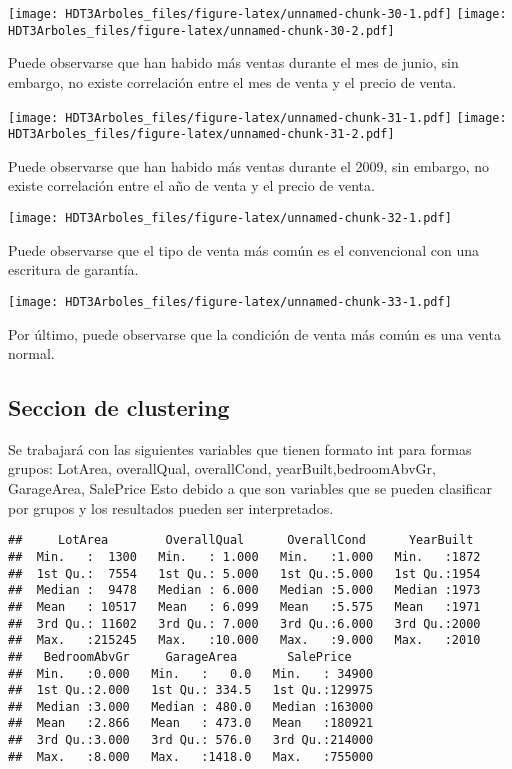 \documentclass[
]{article}
\begin{document}
\texttt{[image: HDT3Arboles\_files/figure-latex/unnamed-chunk-30-1.pdf]}
\texttt{[image: HDT3Arboles\_files/figure-latex/unnamed-chunk-30-2.pdf]}

Puede observarse que han habido más ventas durante el mes de junio, sin
embargo, no existe correlación entre el mes de venta y el precio de
venta.

\texttt{[image: HDT3Arboles\_files/figure-latex/unnamed-chunk-31-1.pdf]}
\texttt{[image: HDT3Arboles\_files/figure-latex/unnamed-chunk-31-2.pdf]}

Puede observarse que han habido más ventas durante el 2009, sin embargo,
no existe correlación entre el año de venta y el precio de venta.

\texttt{[image: HDT3Arboles\_files/figure-latex/unnamed-chunk-32-1.pdf]}

Puede observarse que el tipo de venta más común es el convencional con
una escritura de garantía.

\texttt{[image: HDT3Arboles\_files/figure-latex/unnamed-chunk-33-1.pdf]}

Por último, puede observarse que la condición de venta más común es una
venta normal.

\hypertarget{seccion-de-clustering}{%
\subsection{Seccion de clustering}\label{seccion-de-clustering}}

Se trabajará con las siguientes variables que tienen formato int para
formas grupos: LotArea, overallQual, overallCond,
yearBuilt,bedroomAbvGr, GarageArea, SalePrice Esto debido a que son
variables que se pueden clasificar por grupos y los resultados pueden
ser interpretados.

\begin{verbatim}
##     LotArea        OverallQual      OverallCond      YearBuilt   
##  Min.   :  1300   Min.   : 1.000   Min.   :1.000   Min.   :1872  
##  1st Qu.:  7554   1st Qu.: 5.000   1st Qu.:5.000   1st Qu.:1954  
##  Median :  9478   Median : 6.000   Median :5.000   Median :1973  
##  Mean   : 10517   Mean   : 6.099   Mean   :5.575   Mean   :1971  
##  3rd Qu.: 11602   3rd Qu.: 7.000   3rd Qu.:6.000   3rd Qu.:2000  
##  Max.   :215245   Max.   :10.000   Max.   :9.000   Max.   :2010  
##   BedroomAbvGr     GarageArea       SalePrice     
##  Min.   :0.000   Min.   :   0.0   Min.   : 34900  
##  1st Qu.:2.000   1st Qu.: 334.5   1st Qu.:129975  
##  Median :3.000   Median : 480.0   Median :163000  
##  Mean   :2.866   Mean   : 473.0   Mean   :180921  
##  3rd Qu.:3.000   3rd Qu.: 576.0   3rd Qu.:214000  
##  Max.   :8.000   Max.   :1418.0   Max.   :755000
\end{verbatim}
\end{document}
